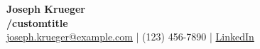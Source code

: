 \centering
{\Huge \textbf{Joseph Krueger}} \\[0.5em]
{\large \textbf{/customtitle}} \\[0.5em]
{\large \href{mailto:joseph.krueger@example.com}{joseph.krueger@example.com} | (123) 456-7890 | \href{https://linkedin.com/in/josephkrueger}{LinkedIn}} \\[1em]